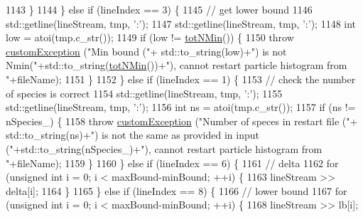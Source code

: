 \begin{DoxyCode}
1143                 \}
1144             \} \textcolor{keywordflow}{else} \textcolor{keywordflow}{if} (lineIndex == 3) \{
1145                 \textcolor{comment}{// get lower bound}
1146                 std::getline(lineStream, tmp, \textcolor{charliteral}{':'});
1147                 std::getline(lineStream, tmp, \textcolor{charliteral}{':'});
1148                 \textcolor{keywordtype}{int} low = atoi(tmp.c\_str());
1149                 \textcolor{keywordflow}{if} (low != \hyperlink{classsim_system_af10842e0eaa638373b8717c87b47e6bc}{totNMin}()) \{
1150                     \textcolor{keywordflow}{throw} \hyperlink{classcustom_exception}{customException} (\textcolor{stringliteral}{"Min bound ("}+ std::to\_string(low)+\textcolor{stringliteral}{") is not
       Nmin("}+std::to\_string(\hyperlink{classsim_system_af10842e0eaa638373b8717c87b47e6bc}{totNMin}())+\textcolor{stringliteral}{"), cannot restart particle histogram from "}+fileName);
1151                 \}
1152             \} \textcolor{keywordflow}{else} \textcolor{keywordflow}{if} (lineIndex == 1) \{
1153                 \textcolor{comment}{// check the number of species is correct}
1154                 std::getline(lineStream, tmp, \textcolor{charliteral}{':'});
1155                 std::getline(lineStream, tmp, \textcolor{charliteral}{':'});
1156                 \textcolor{keywordtype}{int} ns = atoi(tmp.c\_str());
1157                 \textcolor{keywordflow}{if} (ns != nSpecies\_) \{
1158                     \textcolor{keywordflow}{throw} \hyperlink{classcustom_exception}{customException} (\textcolor{stringliteral}{"Number of speces in restart file ("}+ 
      std::to\_string(ns)+\textcolor{stringliteral}{") is not the same as provided in input ("}+std::to\_string(nSpecies\_)+\textcolor{stringliteral}{"), cannot restart particle
       histogram from "}+fileName);
1159                 \}
1160             \} \textcolor{keywordflow}{else} \textcolor{keywordflow}{if} (lineIndex == 6) \{
1161                 \textcolor{comment}{// delta}
1162                 \textcolor{keywordflow}{for} (\textcolor{keywordtype}{unsigned} \textcolor{keywordtype}{int} i = 0; i < maxBound-minBound; ++i) \{
1163                     lineStream >> delta[i];
1164                 \}
1165             \} \textcolor{keywordflow}{else} \textcolor{keywordflow}{if} (lineIndex == 8) \{
1166                 \textcolor{comment}{// lower bound}
1167                 \textcolor{keywordflow}{for} (\textcolor{keywordtype}{unsigned} \textcolor{keywordtype}{int} i = 0; i < maxBound-minBound; ++i) \{
1168                     lineStream >> lb[i];

\end{DoxyCode}
